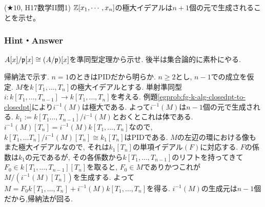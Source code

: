 \begin{prob} ($\bigstar 10$, H17数学II問1)
$\mathbb{Z}[x_1,\cdots, x_n]$の極大イデアルは$n+1$個の元で生成されることを示せ。
\end{prob}


\subsubsection{Hint・Answer}
{\small

\begin{probans}
$A[x]/\mathfrak{p}[x] \cong (A/\mathfrak{p})[x]$を準同型定理から示せ. 後半は集合論的に素朴にやる.
\end{probans}


\begin{probans}
帰納法で示す. $n=1$のときはPIDだから明らか. $n\geq 2$とし,  $n-1$での成立を仮定. $M$を$k[T_1,\dots, T_n]$の極大イデアルとする. 単射準同型$i:k[T_1,\dots, T_{n-1}]\to k[T_1,\dots, T_n]$を考える. 例題\ref{egprob:fg-k-alg-closedpt-to-closedpt}により$i^{-1}(M)$は極大である. よって$i^{-1}(M)$は$n-1$個の元で生成される. $k_1 := k[T_1\dots, T_{n-1}]/i^{-1}(M)$とおくとこれは体である. $i^{-1}(M)[T_n] = i^{-1}(M)k[T_1,\dots, T_n]$なので, $k[T_1,\dots T_n]/i^{-1}(M)[T_n] \cong k_1[T_n]$はPIDである. $M$の左辺の環における像もまた極大イデアルなので, それは$k_1[T_n]$の単項イデアル$(F)$に対応する. $F$の係数は$k_1$の元であるが, その各係数から$k[T_1,\dots, T_{n-1}]$のリフトを持ってきて$F_0\in k[T_1,\dots, T_{n-1}][T_n]$を取ると, $F_0\in M$でありかつこれが$M/(i^{-1}(M)[T_n])$を生成する. よって$M = F_0k[T_1,\dots, T_n] + i^{-1}(M)k[T_1,\dots, T_n]$を得る. $i^{-1}(M)$の生成元は$n-1$個だから,帰納法が回る.
\end{probans}




\begin{probans}
\end{probans}
\begin{probans}
\end{probans}
\begin{probans}
\end{probans}

}















\clearpage
